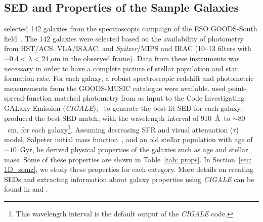  \subsection{SED and Properties of the Sample Galaxies} 
     selected 142 galaxies from the spectroscopic campaign of the ESO GOODS-South field~\citep{Vanzella05, Vanzella06, Vanzella08}.
    The 142 galaxies were selected based on the availability of photometry from HST/ACS, VLA/ISAAC, and {\it Spitzer}/MIPS and IRAC (10--13 filters with $\sim 0.4<\lambda<24~\mu$m in the observed frame).
   Data from these instruments was necessary in order to have a complete picture of stellar population and star formation rate. 
    For each galaxy, a robust spectroscopic redshift and photometric measurements from the GOODS-MUSIC catalogue \citep{Santini09} were available.
 used point-spread-function matched photometry 
    from \citet{Santini09} as input to the Code Investigating GALaxy Emission ({\em CIGALE});~\citep[][hereafter N09]{Noll09} to generate the best-fit SED for each galaxy.
     produced the best SED match, with the wavelength interval of 910~\AA~to $\sim 80$~cm, for each galaxy\footnote{This wavelength interval is the default output of the {\em CIGALE} code.}.
    Assuming decreasing SFR and visual attenuation ($\tau$) model, Salpeter initial mass function~\citep{Salpeter55}, and an old stellar population with age of $\sim 10$~Gyr, he derived physical properties of the galaxies such as age and stellar mass.
    Some of these properties are shown in Table~\ref{tab: props}.
    In Section~\ref{sec: 1D_somz}, we study these properties for each category.
    More details on creating SEDs and extracting information about galaxy properties using {\em CIGALE} can be found in  and .
    
